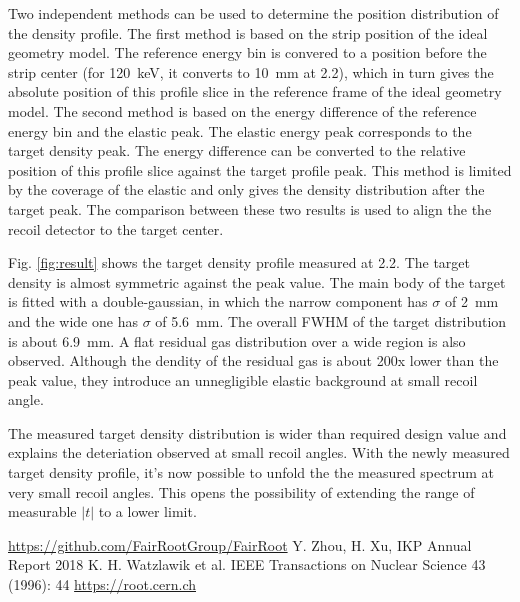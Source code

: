 \documentclass[fleqn,twocolumn,a4paper]{ikpar}
\begin{document}
Two independent methods can be used to determine the position distribution of the density profile.
The first method is based on the strip position of the ideal geometry model.
The reference energy bin is convered to a position before the strip center (for
\SI{120}{\keV}, it converts to \SI{10}{\mm} at \SI{2.2}{\mom}), which in turn
gives the absolute position of this profile slice in the reference frame of the
ideal geometry model.
The second method is based on the energy difference of the reference energy bin
and the elastic peak.
The elastic energy peak corresponds to the target density peak.
The energy difference can be converted to the relative position of this profile
slice against the target profile peak.
This method is limited by the coverage of the elastic and only gives the density distribution after the target peak.
The comparison between these two results is used to align the the recoil
detector to the target center.
\par
\medskip

Fig. \ref{fig:result} shows the target density profile measured at
\SI{2.2}{\mom}.
The target density is almost symmetric against the peak value.
The main body of the target is fitted with a double-gaussian, in which the
narrow component has $\sigma$ of \SI{2}{mm} and the wide one has $\sigma$ of \SI{5.6}{mm}.
The overall FWHM of the target distribution is about \SI{6.9}{mm}.
A flat residual gas distribution over a wide region is also observed.
Although the dendity of the residual gas is about 200x lower than the peak
value, they introduce an unnegligible elastic background at small recoil angle.

The measured target density distribution is wider than required design value and
explains the deteriation observed at small recoil angles.
With the newly measured target density profile, it's now possible to unfold the the
measured spectrum at very small recoil angles.
This opens the possibility of extending the range of measurable $|t|$ to a lower limit.

\par
\medskip

\begin{thebibliography}{99}
 \url{https://github.com/FairRootGroup/FairRoot}
 Y. Zhou, H. Xu, IKP Annual Report 2018
 K. H. Watzlawik et al. IEEE Transactions on Nuclear Science 43 (1996): 44
 \url{https://root.cern.ch}
\end{thebibliography}
\end{document}
